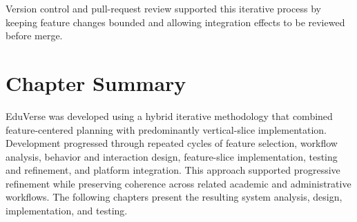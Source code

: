 Version control and pull-request review supported this iterative process by
keeping feature changes bounded and allowing integration effects to be reviewed
before merge.

\section{Chapter Summary}\label{sec:chapter3_summary}

EduVerse was developed using a hybrid iterative methodology that combined
feature-centered planning with predominantly vertical-slice implementation.
Development progressed through repeated cycles of feature selection, workflow
analysis, behavior and interaction design, feature-slice implementation,
testing and refinement, and platform integration. This approach supported
progressive refinement while preserving coherence across related academic and
administrative workflows. The following chapters present the resulting system
analysis, design, implementation, and testing.
